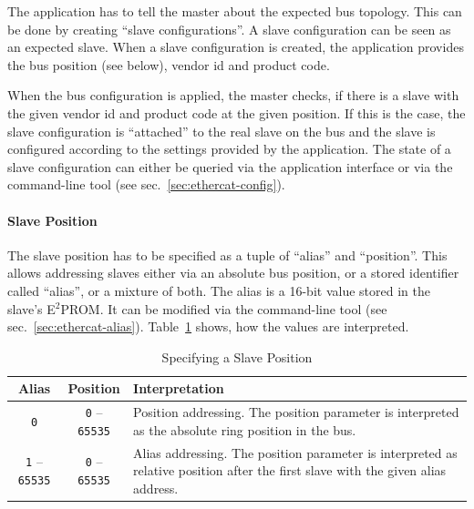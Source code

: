 \documentclass[a4paper,12pt,BCOR6mm,bibtotoc,idxtotoc]{scrbook}
\begin{document}
The application has to tell the master about the expected bus topology. This
can be done by creating ``slave configurations''. A slave configuration can be
seen as an expected slave. When a slave configuration is created, the
application provides the bus position (see below), vendor id and product code.

When the bus configuration is applied, the master checks, if there is a slave
with the given vendor id and product code at the given position. If this is
the case, the slave configuration is ``attached'' to the real slave on the bus
and the slave is configured according to the settings provided by the
application. The state of a slave configuration can either be queried via the
application interface or via the command-line tool (see
sec.~\ref{sec:ethercat-config}).

\paragraph{Slave Position} The slave position has to be specified as a tuple
of ``alias'' and ``position''. This allows addressing slaves either via an
absolute bus position, or a stored identifier called ``alias'', or a mixture
of both. The alias is a 16-bit value stored in the slave's E$^2$PROM. It can
be modified via the command-line tool (see sec.~\ref{sec:ethercat-alias}).
Table~\ref{tab:slaveposition} shows, how the values are interpreted.

\begin{table}[htbp]
  \centering
  \caption{Specifying a Slave Position}
  \label{tab:slaveposition}
  \vspace{2mm}
  \begin{tabular}{c|c|p{70mm}}
    Alias & Position & Interpretation\\
    \hline

    \lstinline+0+ & \lstinline+0+ -- \lstinline+65535+ &

    Position addressing. The position parameter is interpreted as the absolute
    ring position in the bus.\\ \hline

    \lstinline+1+ -- \lstinline+65535+ & \lstinline+0+ -- \lstinline+65535+ &

    Alias addressing. The position parameter is interpreted as relative
    position after the first slave with the given alias address. \\ \hline

  \end{tabular}
\end{table}
\end{document}
